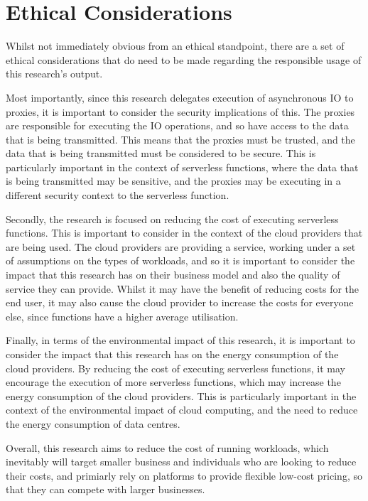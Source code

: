 \chapter{Ethical Considerations}
Whilst not immediately obvious from an ethical standpoint, there are a set of ethical considerations that do need to be made regarding the responsible usage of this research's output.

Most importantly, since this research delegates execution of asynchronous IO to proxies, it is important to consider the security implications of this. The proxies are responsible for executing the IO operations, and so have access to the data that is being transmitted. This means that the proxies must be trusted, and the data that is being transmitted must be considered to be secure. This is particularly important in the context of serverless functions, where the data that is being transmitted may be sensitive, and the proxies may be executing in a different security context to the serverless function.

Secondly, the research is focused on reducing the cost of executing serverless functions. This is important to consider in the context of the cloud providers that are being used. The cloud providers are providing a service, working under a set of assumptions on the types of \faas{} workloads, and so it is important to consider the impact that this research has on their business model and also the quality of service they can provide. Whilst it may have the benefit of reducing costs for the end user, it may also cause the cloud provider to increase the costs for everyone else, since functions have a higher average utilisation.

Finally, in terms of the environmental impact of this research, it is important to consider the impact that this research has on the energy consumption of the cloud providers. By reducing the cost of executing serverless functions, it may encourage the execution of more serverless functions, which may increase the energy consumption of the cloud providers. This is particularly important in the context of the environmental impact of cloud computing, and the need to reduce the energy consumption of data centres.

Overall, this research aims to reduce the cost of running \faas{} workloads, which inevitably will target smaller business and individuals who are looking to reduce their costs, and primiarly rely on \faas{} platforms to provide flexible low-cost pricing, so that they can compete with larger businesses.

